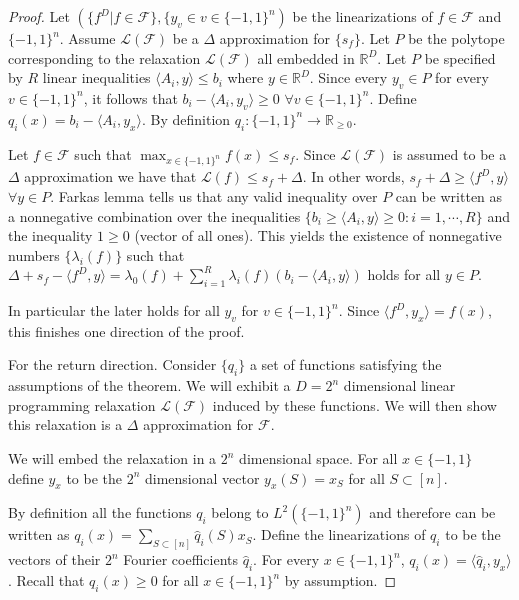 \begin{proof}
Let $(\{f^D | f \in \mathcal{F} \}, \{y_v \in v \in\{-1,1\}^n)$ be the linearizations of $f \in \mathcal{F}$ and $ \{-1,1\}^n$. Assume $\mathcal{L}(\mathcal{F})$ be a $\Delta$ approximation for $\{s_f\}$. Let $P$ be the polytope corresponding to the relaxation $\mathcal{L}(\mathcal{F})$ all embedded in $\mathbb{R}^D$. Let $P$ be specified by $R$ linear inequalities $\langle A_i , y \rangle \leq b_i$ where $y \in \mathbb{R}^D$. Since every $y_v \in P$ for every $v \in \{-1,1\}^n$, it follows that $b_i - \langle A_i , y_v \rangle  \geq 0$ $\forall v \in \{-1,1\}^n$. Define $q_i(x) = b_i - \langle A_i, y_x\rangle$. By definition $q_i : \{ -1,1\}^n \rightarrow \mathbb{R}_{\geq 0}$. 


Let $f \in \mathcal{F}$ such that $\max_{x \in \{-1,1\}^n} f(x) \leq s_f$. Since $\mathcal{L}(\mathcal{F})$ is assumed to be a $\Delta$ approximation we have that $\mathcal{L}(f) \leq s_f + \Delta$. In other words, $s_f + \Delta \geq \langle f^D, y \rangle $  $\forall  y \in P$. Farkas lemma tells us that any valid inequality over $P$ can be written as a nonnegative combination over the inequalities $\{ b_i \geq \langle A_i, y \rangle \geq 0: i= 1, \cdots, R \}$ and the inequality $1 \geq 0$ (vector of all ones). This yields the existence of nonnegative numbers $\{\lambda_i(f)\}$ such that $\Delta + s_f - \langle f^D, y \rangle = \lambda_0(f)  + \sum_{i=1}^R \lambda_i(f)( b_i - \langle A_i, y \rangle)$ holds for all $y \in P$.

In particular the later holds for all $y_v$ for $v \in \{-1,1\}^n$.  Since $\langle f^D, y_x \rangle  = f(x)$, this finishes one direction of the proof.

For the return direction. Consider $\{q_i\}$ a set of functions satisfying the assumptions of the theorem. We will exhibit a $D = 2^n$ dimensional linear programming relaxation $\mathcal{L}(\mathcal{F})$ induced by these functions. We will then show this relaxation is a $\Delta$ approximation for $\mathcal{F}$.

We will embed the relaxation in a $2^n$ dimensional space. For all $x \in \{-1,1\}$ define $y_x$ to be the $2^n$ dimensional vector $y_x(S) = x_S$ for all $S \subset [n]$. 

By definition all the functions $q_i$ belong to $L^2(\{-1,1\}^n)$ and therefore can be written as $q_i(x) = \sum_{S \subset [n]} \hat{q}_i(S) x_S$. Define the linearizations of $q_i$
 to be the vectors of their $2^n$ Fourier coefficients $\hat{q}_i$. For every $x \in \{-1,1\}^n$, $q_i(x) = \langle \hat{q}_i, y_x \rangle$. Recall that $q_i(x) \geq 0$ for all $x \in \{-1,1\}^n$ by assumption.
 

\end{proof}
